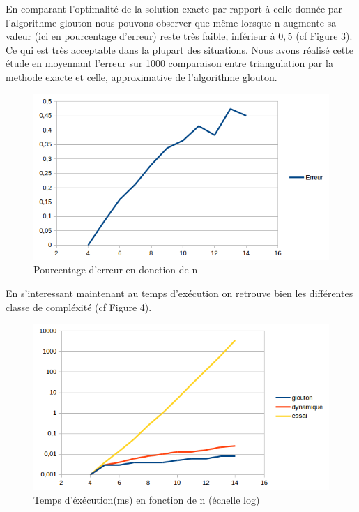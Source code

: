\documentclass[a4paper,10pt]{article}
\begin{document}
En comparant l'optimalité de la solution exacte par rapport à celle donnée par l'algorithme glouton nous pouvons observer que même lorsque n augmente sa valeur (ici en pourcentage d'erreur) reste très faible, inférieur à $0,5$ (cf Figure 3).
Ce qui est très acceptable dans la plupart des situations. 
Nous avons réalisé cette étude en moyennant l'erreur sur 1000 comparaison entre triangulation par la methode exacte et celle, approximative de l'algorithme glouton.

\begin{figure}[h!]
\begin{center}
\includegraphics[scale=1]{benchmark2.png}
\caption{Pourcentage d'erreur en donction de n}
\end{center}
\end{figure}

En s'interessant maintenant au temps d'exécution on retrouve bien les différentes classe de compléxité (cf Figure 4).

\begin{figure}[h!]
\begin{center}
\includegraphics[scale=1]{benchmark.png}
\caption{Temps d'éxécution(ms) en fonction de n (échelle log)}
\end{center}
\end{figure}
\end{document}
